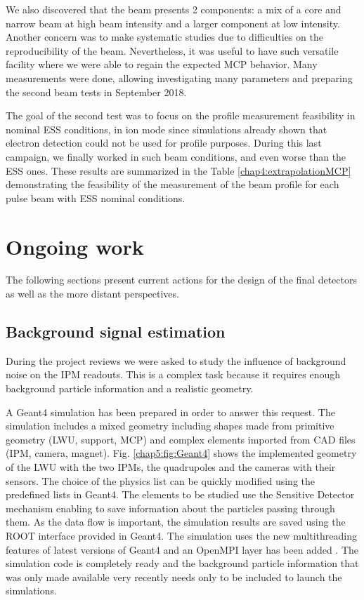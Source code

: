 We also discovered that the beam presents 2 components: a mix of a core and narrow beam at high beam intensity and a larger component at low intensity. Another concern was to make systematic studies due to difficulties on the reproducibility of the beam. Nevertheless, it was useful to have such versatile facility where we were able to regain the expected MCP behavior. Many measurements were done, allowing investigating many parameters and preparing the second beam tests in September 2018.

The goal of the second test was to focus on the profile measurement feasibility in nominal ESS conditions, in ion mode since simulations already shown that electron detection could not be used for profile purposes. During this last campaign, we finally worked in such beam conditions, and even worse than the ESS ones. These results are summarized in the Table \ref{chap4:extrapolationMCP} demonstrating the feasibility of the measurement of the beam profile for each pulse beam with ESS nominal conditions.

\section*{Ongoing work}

The following sections present current actions for the design of the final detectors as well as the more distant perspectives.
%
\subsection*{Background signal estimation}

During the project reviews we were asked to study the influence of background noise on the IPM readouts. This is a complex task because it requires enough background particle information  and a realistic geometry.

A Geant4 simulation has been prepared in order to answer this request. The simulation includes a mixed geometry including shapes made from primitive geometry (LWU, support, MCP) and complex elements imported from CAD files (IPM, camera, magnet). Fig. \ref{chap5:fig:Geant4} shows the implemented geometry of the LWU with the two IPMs, the quadrupoles and the cameras with their sensors. The choice of the physics list can be quickly modified using the predefined lists in Geant4. The elements to be studied use the Sensitive Detector mechanism enabling to save information about the particles passing through them. As the data flow is important, the simulation results are saved using the ROOT interface provided in Geant4. The simulation uses the new multithreading features of latest versions of Geant4 and an OpenMPI layer has been added \cite{Allison2006,Dotti2016}. The simulation code is completely ready and the background particle information that was only made available very recently needs only to be included to launch the simulations.

